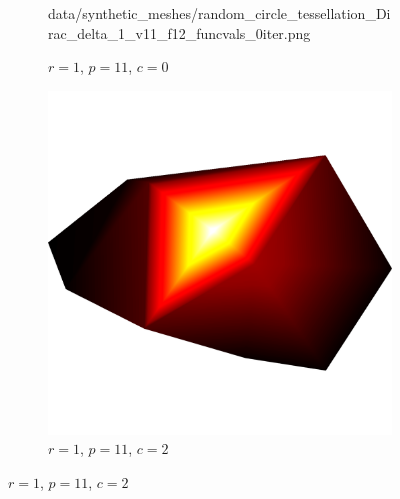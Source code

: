 \begin{figure}[ht]
\begin{subfigure}[b]{0.32\linewidth}
		{data/synthetic_meshes/random_circle_tessellation_Dirac_delta_1_v11_f12_funcvals_0iter.png}
		\caption{$r=1$, $p=11$, $c=0$}\label{fig:rcirc.c}
	\end{subfigure}
	\begin{subfigure}[b]{0.32\linewidth}
		\includegraphics[width=\linewidth,]
		{data/synthetic_meshes/random_circle_tessellation_Dirac_delta_1_v11_f12_funcvals_2iter.png}
		\caption{$r=1$, $p=11$, $c=2$}\label{fig:rcirc.e}
	\end{subfigure}


\end{figure}
